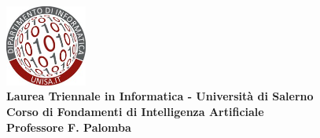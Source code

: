 \documentclass[a4paper,12pt]{article}
\begin{document}
\begin{center}
    \includegraphics[width=0.2\textwidth]{./grafici/logo.jpg}\\[0.5cm]
    \textbf{\large Laurea Triennale in Informatica - Università di Salerno}\\
    \textbf{\large Corso di Fondamenti di Intelligenza Artificiale}\\
    \textbf{\large Professore F. Palomba}\\[1.5cm]
    \textcolor{titlecolor}{\Huge }
\end{center}

\vspace{-2cm}

\setcounter{tocdepth}{3}
\renewcommand{\contentsname}{\textcolor{blue}{Sommario}}
\tableofcontents

\newpage

\end{document}
